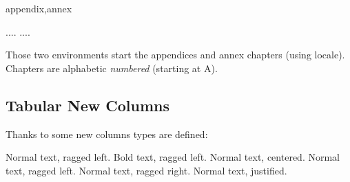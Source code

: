 \documentclass[dctools,english,tocdepth=3,secdepth=3]{ufrgscca} %
\begin{document}
\begin{Envs}{appendix,annex}
	\begin{Syntax}%
		\Macro{\begin{appendix}}{}.... \Macro{\end{appendix}}{}
		\Macro{\begin{annex}}{}.... \Macro{\end{annex}}{}
	\end{Syntax}
\end{Envs}
Those two environments start the appendices and annex chapters (using locale). Chapters are  alphabetic \emph{numbered} (starting at A).
\subsection{Tabular New Columns}
Thanks to  some new columns types are defined:
\begin{Values}
	  Normal text, ragged left.
	  Bold text, ragged left.
	  Normal text, centered.
	  Normal text, ragged left.
	  Normal text, ragged right.
	  Normal text, justified.

	\end{Values}
\end{document}
